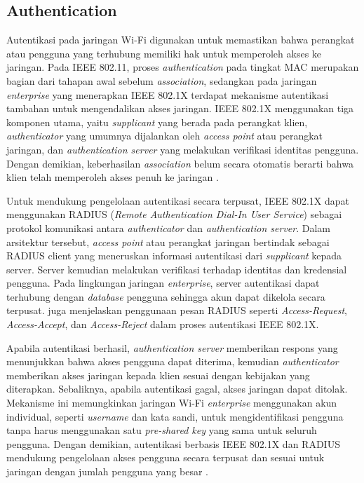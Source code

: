 \subsection{Authentication}

Autentikasi pada jaringan Wi-Fi digunakan untuk memastikan bahwa perangkat atau pengguna yang terhubung memiliki hak untuk memperoleh akses ke jaringan. Pada IEEE 802.11, proses \textit{authentication} pada tingkat MAC merupakan bagian dari tahapan awal sebelum \textit{association}, sedangkan pada jaringan \textit{enterprise} yang menerapkan IEEE 802.1X terdapat mekanisme autentikasi tambahan untuk mengendalikan akses jaringan. IEEE 802.1X menggunakan tiga komponen utama, yaitu \textit{supplicant} yang berada pada perangkat klien, \textit{authenticator} yang umumnya dijalankan oleh \textit{access point} atau perangkat jaringan, dan \textit{authentication server} yang melakukan verifikasi identitas pengguna. Dengan demikian, keberhasilan \textit{association} belum secara otomatis berarti bahwa klien telah memperoleh akses penuh ke jaringan \parencite{CISCO_MERAKI_80211_ASSOCIATION_2025}.

Untuk mendukung pengelolaan autentikasi secara terpusat, IEEE 802.1X dapat menggunakan RADIUS (\textit{Remote Authentication Dial-In User Service}) sebagai protokol komunikasi antara \textit{authenticator} dan \textit{authentication server}. Dalam arsitektur tersebut, \textit{access point} atau perangkat jaringan bertindak sebagai RADIUS client yang meneruskan informasi autentikasi dari \textit{supplicant} kepada server. Server kemudian melakukan verifikasi terhadap identitas dan kredensial pengguna. Pada lingkungan jaringan \textit{enterprise}, server autentikasi dapat terhubung dengan \textit{database} pengguna sehingga akun dapat dikelola secara terpusat. \textcite{RFC 3580} juga menjelaskan penggunaan pesan RADIUS seperti \textit{Access-Request}, \textit{Access-Accept}, dan \textit{Access-Reject} dalam proses autentikasi IEEE 802.1X.

Apabila autentikasi berhasil, \textit{authentication server} memberikan respons yang menunjukkan bahwa akses pengguna dapat diterima, kemudian \textit{authenticator} memberikan akses jaringan kepada klien sesuai dengan kebijakan yang diterapkan. Sebaliknya, apabila autentikasi gagal, akses jaringan dapat ditolak. Mekanisme ini memungkinkan jaringan Wi-Fi \textit{enterprise} menggunakan akun individual, seperti \textit{username} dan kata sandi, untuk mengidentifikasi pengguna tanpa harus menggunakan satu \textit{pre-shared key} yang sama untuk seluruh pengguna. Dengan demikian, autentikasi berbasis IEEE 802.1X dan RADIUS mendukung pengelolaan akses pengguna secara terpusat dan sesuai untuk jaringan dengan jumlah pengguna yang besar \parencite{RFC3580}.

